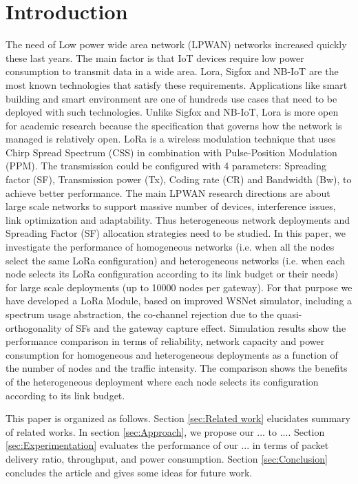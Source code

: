 \section{Introduction} \label{sec:Introduction}

The need of Low power wide area network (LPWAN) networks increased quickly these last years.
The main factor is that IoT devices require low power consumption to transmit data in a wide area.
Lora,
	Sigfox and NB-IoT are the most known technologies that satisfy these requirements.
Applications like smart building and smart environment are one of hundreds use cases that need to be deployed with such technologies.
Unlike Sigfox and NB-IoT,
	Lora is more open for academic research because the specification that governs how the network is managed is relatively open.
LoRa is a wireless modulation technique that uses Chirp Spread Spectrum (CSS) in combination with Pulse-Position Modulation (PPM).
The transmission could be configured with 4 parameters:
	Spreading factor (SF),
	Transmission power (Tx),
	Coding rate (CR) and Bandwidth (Bw),
	to achieve better performance.
The main LPWAN research directions are about large scale networks to support massive number of devices,
	interference issues,
	link optimization and adaptability.
Thus heterogeneous network deployments and Spreading Factor (SF) allocation strategies need to be studied.
In this paper,
	we investigate the performance of homogeneous networks (i.e.
when all the nodes select the same LoRa configuration) and heterogeneous networks (i.e.
when each node selects its LoRa configuration according to its link budget or their needs) for large scale deployments (up to 10000 nodes per gateway).
For that purpose we have developed a LoRa Module,
	based on improved WSNet simulator,
	including a spectrum usage abstraction,
	the co-channel rejection due to the quasi-orthogonality of SFs and the gateway capture effect.
Simulation results show the performance comparison in terms of reliability,
	network capacity and power consumption for homogeneous and heterogeneous deployments as a function of the number of nodes and the traffic intensity.
The comparison shows the benefits of the heterogeneous deployment where each node selects its configuration according to its link budget.

This paper is organized as follows.
Section \ref{sec:Related work} elucidates summary of related works.
In section \ref{sec:Approach}, we propose our ... to ....
Section \ref{sec:Experimentation} evaluates the performance of our ... in terms of packet delivery ratio,
	throughput,
	and power consumption.
Section \ref{sec:Conclusion} concludes the article and gives some ideas for future work.

